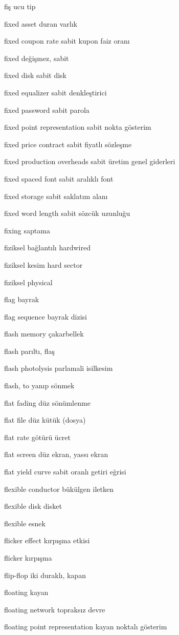 \documentclass[12pt,fleqn]{article}\usepackage{../../common}
\begin{document}
fiş ucu tip

fixed asset duran varlık

fixed coupon rate sabit kupon faiz oranı

fixed değişmez, sabit

fixed disk sabit disk

fixed equalizer sabit denkleştirici

fixed password sabit parola

fixed point representation sabit nokta gösterim

fixed price contract sabit fiyatlı sözleşme

fixed production overheads sabit üretim genel giderleri

fixed spaced font sabit aralıklı font

fixed storage sabit saklatım alanı

fixed word length sabit sözcük uzunluğu

fixing saptama

fiziksel bağlantılı hardwired

fiziksel kesim hard sector

fiziksel physical

flag bayrak

flag sequence bayrak dizisi

flash memory çakarbellek

flash parıltı, flaş

flash photolysis parlamali isilkesim

flash, to yanıp sönmek

flat fading düz sönümlenme

flat file düz kütük (dosya)

flat rate götürü ücret

flat screen düz ekran, yassı ekran

flat yield curve sabit oranlı getiri eğrisi

flexible conductor bükülgen iletken

flexible disk disket

flexible esnek

flicker effect kırpışma etkisi

flicker kırpışma

flip-flop iki duraklı, kapan

floating kayan

floating network topraksız devre

floating point representation kayan noktalı gösterim
\end{document}
